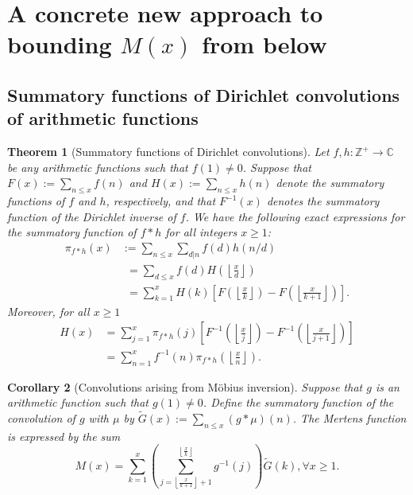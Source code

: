 \documentclass[11pt,reqno,a4letter]{article}
\numberwithin{figure}{section}
\numberwithin{table}{section}
\newcommand{\floor}[1]{\left\lfloor #1 \right\rfloor}
\newcommand{\Floor}[2]{\ensuremath{\left\lfloor \frac{#1}{#2} \right\rfloor}}
\theoremstyle{plain}
\newtheorem{theorem}{Theorem}
\newtheorem{cor}[theorem]{Corollary}
\numberwithin{theorem}{section}
\theoremstyle{definition}
\begin{document}
\begin{itemize}
\end{itemize} 

\newpage 
\section{A concrete new approach to bounding $M(x)$ from below} 

\subsection{Summatory functions of Dirichlet convolutions of arithmetic functions} 

\begin{theorem}[Summatory functions of Dirichlet convolutions] 
\label{theorem_SummatoryFuncsOfDirCvls} 
Let $f,h: \mathbb{Z}^{+} \rightarrow \mathbb{C}$ be any arithmetic functions such that $f(1) \neq 0$. 
Suppose that $F(x) := \sum_{n \leq x} f(n)$ and $H(x) := \sum_{n \leq x} h(n)$ denote the summatory 
functions of $f$ and $h$, respectively, and that $F^{-1}(x)$ denotes the summatory function of the 
Dirichlet inverse of $f$. We have the following exact expressions for the 
summatory function of $f \ast h$ for all integers $x \geq 1$: 
\begin{align*} 
\pi_{f \ast h}(x) & := \sum_{n \leq x} \sum_{d|n} f(d) h(n/d) \\ 
     & \phantom{:}= \sum_{d \leq x} f(d) H\left(\Floor{x}{d}\right) \\ 
     & \phantom{:}= \sum_{k=1}^{x} H(k) \left[F\left(\Floor{x}{k}\right) - 
     F\left(\Floor{x}{k+1}\right)\right]. 
\end{align*} 
Moreover, for all $x \geq 1$ 
\begin{align*} 
H(x) & = \sum_{j=1}^{x} \pi_{f \ast h}(j) \left[F^{-1}\left(\Floor{x}{j}\right) - 
     F^{-1}\left(\Floor{x}{j+1}\right)\right] \\ 
     & = \sum_{n=1}^{x} f^{-1}(n) \pi_{f \ast h}\left(\Floor{x}{n}\right). 
\end{align*} 
\end{theorem} 

\begin{cor}[Convolutions arising from M\"obius inversion] 
\label{cor_CvlGAstMu} 
Suppose that $g$ is an arithmetic function such that 
$g(1) \neq 0$. Define the summatory function of 
the convolution of $g$ with $\mu$ by $\widetilde{G}(x) := \sum_{n \leq x} (g \ast \mu)(n)$. 
The Mertens function is expressed by the sum 
\[
M(x) = \sum_{k=1}^{x} \left(\sum_{j=\floor{\frac{x}{k+1}}+1}^{\floor{\frac{x}{k}}} g^{-1}(j)\right) 
     \widetilde{G}(k), \forall x \geq 1. 
\]
\end{cor} 
\end{document}
